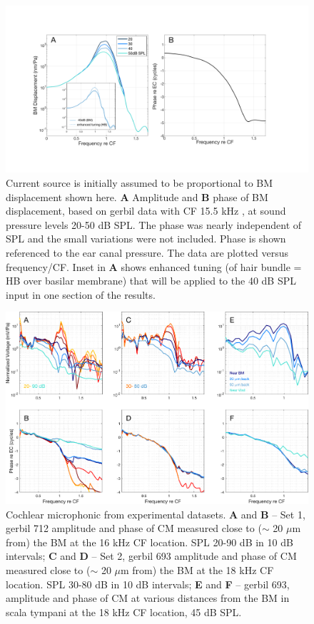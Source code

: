 \documentclass{biophys-new}
\begin{document}
\begin{figure}[h]
\centering
\includegraphics[width = \textwidth]{final_figures/input2.pdf}
\caption{Current source is initially assumed to be proportional to BM displacement shown here.  \textbf{A} Amplitude and \textbf{B} phase of BM displacement, based on gerbil data with CF 15.5 kHz \cite{RenPlos2011}, at sound pressure levels 20-50 dB SPL. The phase was nearly independent of SPL and the small variations were not included. Phase is shown referenced to the ear canal pressure. The data are plotted versus frequency/CF.  Inset in \textbf{A} shows enhanced tuning (of hair bundle = HB over basilar membrane) that will be applied to the 40 dB SPL input in one section of the results.}
\label{input1}
\end{figure}

\begin{figure}[h]
\centering
\includegraphics[width = \textwidth]{final_figures/data2.pdf}
\caption{Cochlear microphonic from experimental datasets. \textbf{A} and \textbf{B} -- Set 1, gerbil 712 \cite{fallah} amplitude and phase of CM measured close to ($\sim$ 20 $\mu$m from) the BM  at the 16 kHz CF location. SPL 20-90 dB in 10 dB intervals; \textbf{C} and \textbf{D} -- Set 2, gerbil 693 \cite{nankaliwang}  amplitude and phase of CM measured close to ($\sim$ 20 $\mu$m from) the BM at the 18 kHz CF location. SPL 30-80 dB in 10 dB intervals; \textbf{E} and \textbf{F} -- gerbil 693, amplitude and phase of CM at various distances from the BM in scala tympani at the 18 kHz CF location, 45 dB SPL.}
\label{data}
\end{figure}
\end{document}

